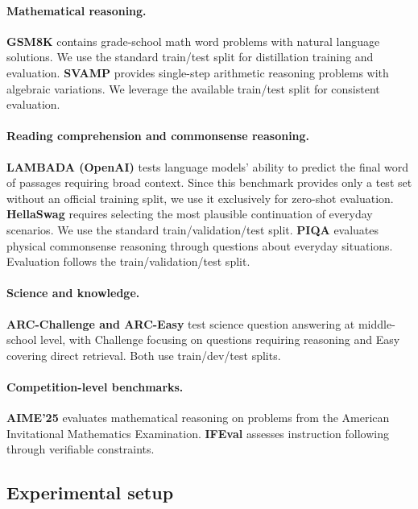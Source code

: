 \documentclass[11pt]{article}
\begin{document}
\paragraph{Mathematical reasoning.}
\textbf{GSM8K} \citep{cobbe2021gsm8k} contains grade-school math word problems with natural language solutions. We use the standard train/test split for distillation training and evaluation.
\textbf{SVAMP} \citep{patel2021svamp} provides single-step arithmetic reasoning problems with algebraic variations. We leverage the available train/test split for consistent evaluation.

\paragraph{Reading comprehension and commonsense reasoning.}
\textbf{LAMBADA (OpenAI)} \citep{paperno2016lambada} tests language models' ability to predict the final word of passages requiring broad context. Since this benchmark provides only a test set without an official training split, we use it exclusively for zero-shot evaluation.
\textbf{HellaSwag} \citep{zellers2019hellaswag} requires selecting the most plausible continuation of everyday scenarios. We use the standard train/validation/test split.
\textbf{PIQA} \citep{bisk2019piqa} evaluates physical commonsense reasoning through questions about everyday situations. Evaluation follows the train/validation/test split.

\paragraph{Science and knowledge.}
\textbf{ARC-Challenge and ARC-Easy} \citep{clark2018arc} test science question answering at middle-school level, with Challenge focusing on questions requiring reasoning and Easy covering direct retrieval. Both use train/dev/test splits.

\paragraph{Competition-level benchmarks.}
\textbf{AIME'25} evaluates mathematical reasoning on problems from the American Invitational Mathematics Examination. 
\textbf{IFEval} \citep{zhou2023ifeval} assesses instruction following through verifiable constraints.

\subsection{Experimental setup}
\end{document}
